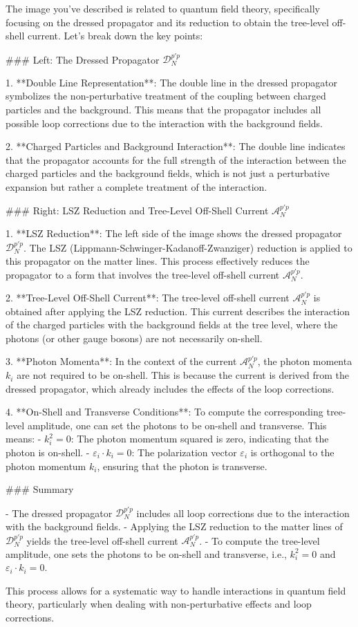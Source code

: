 The image you've described is related to quantum field theory, specifically focusing on the dressed propagator and its reduction to obtain the tree-level off-shell current. Let's break down the key points:

### Left: The Dressed Propagator \(\mathcal{D}^{p'p}_{N}\)

1. **Double Line Representation**: The double line in the dressed propagator symbolizes the non-perturbative treatment of the coupling between charged particles and the background. This means that the propagator includes all possible loop corrections due to the interaction with the background fields.

2. **Charged Particles and Background Interaction**: The double line indicates that the propagator accounts for the full strength of the interaction between the charged particles and the background fields, which is not just a perturbative expansion but rather a complete treatment of the interaction.

### Right: LSZ Reduction and Tree-Level Off-Shell Current \(\mathcal{A}^{p'p}_{N}\)

1. **LSZ Reduction**: The left side of the image shows the dressed propagator \(\mathcal{D}^{p'p}_{N}\). The LSZ (Lippmann-Schwinger-Kadanoff-Zwanziger) reduction is applied to this propagator on the matter lines. This process effectively reduces the propagator to a form that involves the tree-level off-shell current \(\mathcal{A}^{p'p}_{N}\).

2. **Tree-Level Off-Shell Current**: The tree-level off-shell current \(\mathcal{A}^{p'p}_{N}\) is obtained after applying the LSZ reduction. This current describes the interaction of the charged particles with the background fields at the tree level, where the photons (or other gauge bosons) are not necessarily on-shell.

3. **Photon Momenta**: In the context of the current \(\mathcal{A}^{p'p}_{N}\), the photon momenta \(k_i\) are not required to be on-shell. This is because the current is derived from the dressed propagator, which already includes the effects of the loop corrections.

4. **On-Shell and Transverse Conditions**: To compute the corresponding tree-level amplitude, one can set the photons to be on-shell and transverse. This means:
   - \(k_i^2 = 0\): The photon momentum squared is zero, indicating that the photon is on-shell.
   - \(\varepsilon_i \cdot k_i = 0\): The polarization vector \(\varepsilon_i\) is orthogonal to the photon momentum \(k_i\), ensuring that the photon is transverse.

### Summary

- The dressed propagator \(\mathcal{D}^{p'p}_{N}\) includes all loop corrections due to the interaction with the background fields.
- Applying the LSZ reduction to the matter lines of \(\mathcal{D}^{p'p}_{N}\) yields the tree-level off-shell current \(\mathcal{A}^{p'p}_{N}\).
- To compute the tree-level amplitude, one sets the photons to be on-shell and transverse, i.e., \(k_i^2 = 0\) and \(\varepsilon_i \cdot k_i = 0\).

This process allows for a systematic way to handle interactions in quantum field theory, particularly when dealing with non-perturbative effects and loop corrections.